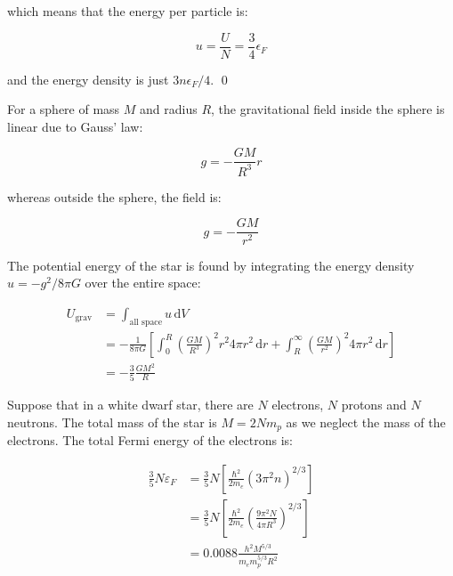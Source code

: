 \documentclass[12pt]{article}
\begin{document}
which means that the energy per particle is:

\begin{equation}
    u = \frac{U}{N} = \frac{3}{4} \epsilon_{F}
\end{equation}

and the energy density is just $3n \epsilon_{F}/4$.
\qed



For a sphere of mass $M$ and radius $R$, the gravitational field inside the sphere is linear due to Gauss' law:

\begin{equation}
    g = -\frac{GM}{R^{3}} r
\end{equation}

whereas outside the sphere, the field is:

\begin{equation}
    g = -\frac{GM}{r^{2}}
\end{equation}

The potential energy of the star is found by integrating the energy density $u = -g^{2}/8\pi G$ over the entire space:

\begin{equation}
    \begin{split}
        U_{\text{grav}} &= \int_{\text{all space}} u \, \mathrm{d}V \\
        &= -\frac{1}{8\pi G} \left[ \int_{0}^{R} \left( \frac{GM}{R^{3}} \right)^{2} r^{2} 4\pi r^{2} \, \mathrm{d}r + \int_{R}^{\infty} \left( \frac{GM}{r^{2}} \right)^{2} 4\pi r^{2} \, \mathrm{d}r \right] \\
        &= -\frac{3}{5} \frac{GM^{2}}{R}
    \end{split}
\end{equation}

Suppose that in a white dwarf star, there are $N$ electrons, $N$ protons and $N$ neutrons. The total mass of the star is $M = 2Nm_{p}$ as we neglect the mass of the electrons. The total Fermi energy of the electrons is:

\begin{equation}
    \begin{split}
        \frac{3}{5} N \varepsilon_{F} &= \frac{3}{5} N \left[ \frac{\hbar^{2}}{2m_{e}} \left( 3\pi^{2} n \right)^{2/3} \right] \\
        &= \frac{3}{5} N \left[ \frac{\hbar^{2}}{2m_{e}} \left( \frac{9\pi^{2} N}{4\pi R^{3}} \right)^{2/3} \right] \\
        &= 0.0088 \frac{h^{2}M^{5/3}}{m_{e}m_{p}^{5/3}R^{2}}
    \end{split}
\end{equation}
\end{document}
